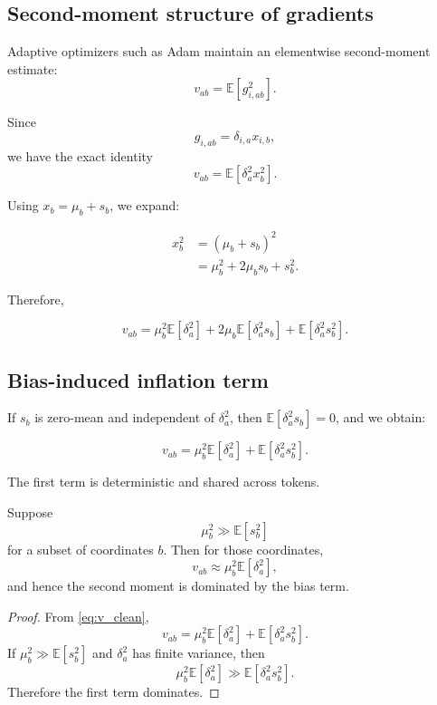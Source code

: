 \subsection{Second-moment structure of gradients}

Adaptive optimizers such as Adam maintain an elementwise second-moment estimate:
\[
v_{ab} = \mathbb{E}[g_{i,ab}^2].
\]

Since
\[
g_{i,ab} = \delta_{i,a} x_{i,b},
\]
we have the exact identity
\[
v_{ab}
=
\mathbb{E}[\delta_{a}^2 x_b^2].
\]

Using $x_b = \mu_b + s_b$, we expand:

\begin{align}
x_b^2
&=
(\mu_b + s_b)^2 \\
&=
\mu_b^2
+
2\mu_b s_b
+
s_b^2.
\end{align}

Therefore,

\begin{equation}
\label{eq:v_expand}
v_{ab}
=
\mu_b^2 \mathbb{E}[\delta_a^2]
+
2\mu_b \mathbb{E}[\delta_a^2 s_b]
+
\mathbb{E}[\delta_a^2 s_b^2].
\end{equation}

\subsection{Bias-induced inflation term}

If $s_b$ is zero-mean and independent of $\delta_a^2$,
then $\mathbb{E}[\delta_a^2 s_b] = 0$, and we obtain:

\begin{equation}
\label{eq:v_clean}
v_{ab}
=
\mu_b^2 \mathbb{E}[\delta_a^2]
+
\mathbb{E}[\delta_a^2 s_b^2].
\end{equation}

The first term is deterministic and shared across tokens.

\begin{theorem}
\label{thm:second_moment_inflation}
Suppose
\[
\mu_b^2 \gg \mathbb{E}[s_b^2]
\]
for a subset of coordinates $b$.
Then for those coordinates,
\[
v_{ab}
\approx
\mu_b^2 \mathbb{E}[\delta_a^2],
\]
and hence the second moment is dominated by the bias term.
\end{theorem}

\begin{proof}
From \eqref{eq:v_clean},
\[
v_{ab}
=
\mu_b^2 \mathbb{E}[\delta_a^2]
+
\mathbb{E}[\delta_a^2 s_b^2].
\]
If $\mu_b^2 \gg \mathbb{E}[s_b^2]$ and $\delta_a^2$ has finite variance,
then
\[
\mu_b^2 \mathbb{E}[\delta_a^2]
\gg
\mathbb{E}[\delta_a^2 s_b^2].
\]
Therefore the first term dominates.
\end{proof}

